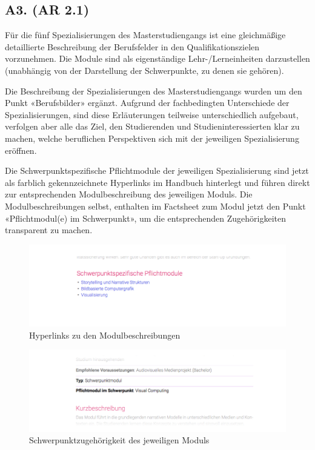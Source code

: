 \subsection{A3. (AR 2.1)
\label{/mi-2017/selbstbericht/auflagen/0000-auflagen}}\label{a3.-ar-2.1-pathlabelmi-2017selbstberichtauflagen0000-auflagen}

\begin{siderules}
Für die fünf Spezialisierungen des Masterstudiengangs ist eine
gleichmäßige detaillierte Beschreibung der Berufsfelder in den
Qualifikationszielen vorzunehmen. Die Module sind als eigenständige
Lehr-/Lerneinheiten darzustellen (unabhängig von der Darstellung der
Schwerpunkte, zu denen sie gehören).
\end{siderules}

Die Beschreibung der Spezialisierungen des Masterstudiengangs wurden um
den Punkt «Berufsbilder» ergänzt. Aufgrund der fachbedingten
Unterschiede der Spezialisierungen, sind diese Erläuterungen teilweise
unterschiedlich aufgebaut, verfolgen aber alle das Ziel, den
Studierenden und Studieninteressierten klar zu machen, welche
beruflichen Perspektiven sich mit der jeweiligen Spezialisierung
eröffnen.

Die Schwerpunktspezifische Pflichtmodule der jeweiligen Spezialisierung
sind jetzt als farblich gekennzeichnete Hyperlinks im Handbuch
hinterlegt und führen direkt zur entsprechenden Modulbeschreibung des
jeweiligen Moduls. Die Modulbeschreibungen selbst, enthalten im
Factsheet zum Modul jetzt den Punkt «Pflichtmodul(e) im Schwerpunkt», um
die entsprechenden Zugehörigkeiten transparent zu machen.

\begin{figure}[htbp]
\centering
\includegraphics[width=\textwidth]{../anhaenge/bilder/hyperlinks.png}
\caption{Hyperlinks zu den Modulbeschreibungen}
\end{figure}

\begin{figure}[htbp]
\centering
\includegraphics[width=\textwidth]{../anhaenge/bilder/pm-im-schwerpunkt.png}
\caption{Schwerpunktzugehörigkeit des jeweiligen Moduls}
\end{figure}
